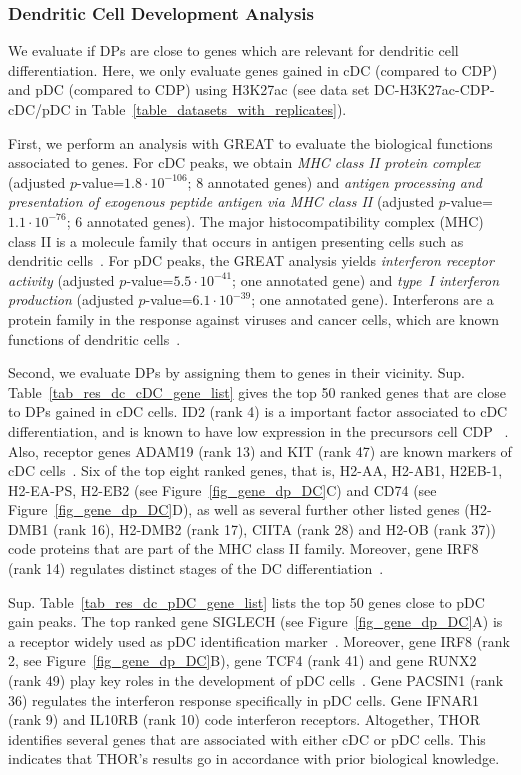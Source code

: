 \subsubsection{Dendritic Cell Development Analysis}
We evaluate if DPs are close to genes which are relevant for dendritic cell differentiation. 
Here, we only evaluate genes gained in cDC (compared to CDP) and pDC (compared to CDP) using H3K27ac (see data set DC-H3K27ac-CDP-cDC/pDC in Table~\ref{table_datasets_with_replicates}).

First, we perform an analysis with GREAT to evaluate the biological functions associated to genes. 
For cDC peaks, we obtain \textit{MHC class II protein complex} (adjusted $p$-value=$1.8 \cdot 10^{-106}$; 8 annotated genes) and \textit{antigen processing and presentation of exogenous peptide antigen via MHC class II} (adjusted $p$-value=$1.1 \cdot 10^{-76}$; 6 annotated genes).
The major histocompatibility complex (MHC) class II is a molecule family that occurs in antigen presenting cells such as dendritic cells~\citep{Ting2002}.
For pDC peaks, the GREAT analysis yields \textit{interferon receptor activity} (adjusted $p$-value=$5.5 \cdot 10^{-41}$; one annotated gene) and \textit{type~I interferon production} (adjusted $p$-value=$6.1 \cdot 10^{-39}$; one annotated gene).
Interferons are a protein family in the response against viruses and cancer cells, which are known functions of dendritic cells~\citep{DeAndrea2002}.

Second, we evaluate DPs by assigning them to genes in their vicinity. 
Sup. Table~\ref{tab_res_dc_cDC_gene_list} gives the top 50 ranked genes that are close to DPs gained in cDC cells.
ID2 (rank 4) is a important factor associated to cDC differentiation, and is known to have low expression in the precursors cell CDP ~\citep{Jackson2011}.
Also, receptor genes ADAM19 (rank 13) and KIT (rank 47) are known markers of cDC cells~\citep{Miller2012}.
Six of the top eight ranked genes, that is, H2-AA, H2-AB1, H2EB-1, H2-EA-PS, H2-EB2 (see Figure~\ref{fig_gene_dp_DC}C) and CD74 (see Figure~\ref{fig_gene_dp_DC}D), as well as several further other listed genes (H2-DMB1 (rank 16), H2-DMB2 (rank 17), CIITA (rank 28) and H2-OB (rank 37)) code proteins that are part of the MHC class II family.
Moreover, gene IRF8 (rank 14) regulates distinct stages of the DC differentiation~\citep{Jackson2011}.
 
Sup. Table~\ref{tab_res_dc_pDC_gene_list} lists the top 50 genes close to pDC gain peaks. 
The top ranked gene SIGLECH (see Figure~\ref{fig_gene_dp_DC}A) is a receptor widely used as pDC identification marker~\citep{Zhang2006}.
Moreover, gene IRF8 (rank 2, see Figure~\ref{fig_gene_dp_DC}B), gene TCF4 (rank 41) and gene RUNX2 (rank 49) play key roles in the development of pDC cells~\citep{Jaiswal2013, Cisse2008, Sawai2013}.
Gene PACSIN1 (rank 36) regulates the interferon response specifically in pDC cells.
Gene IFNAR1 (rank 9) and IL10RB (rank 10) code interferon receptors.
Altogether, THOR identifies several genes that are associated with either cDC or pDC cells. 
This indicates that THOR's results go in accordance with prior biological knowledge.

